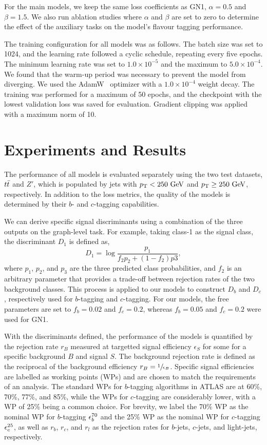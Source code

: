 For the main models, we keep the same loss coefficients as GN1, $\alpha = 0.5$ and $\beta = 1.5$.
We also run ablation studies where $\alpha$ and $\beta$ are set to zero to determine the effect of the auxiliary tasks on the model's flavour tagging performance.

The training configuration for all models was as follows.
The batch size was set to 1024, and the learning rate followed a cyclic schedule, repeating every five epochs.
The minimum learning rate was set to $1.0 \times 10^{-5}$ and the maximum to $5.0 \times 10^{-4}$.
We found that the warm-up period was necessary to prevent the model from diverging.
We used the AdamW~\cite{AdamW} optimizer with a $1.0 \times 10^{-4}$ weight decay.
The training was performed for a maximum of 50 epochs, and the checkpoint with the lowest validation loss was saved for evaluation.
Gradient clipping was applied with a maximum norm of 10.

\section{Experiments and Results}

The performance of all models is evaluated separately using the two test datasets, $t\bar{t}$ and $Z'$, which is populated by jets with $\pt < 250~\GeV$ and $\pt \geq 250~\GeV$, respectively.
In addition to the loss metrics, the quality of the models is determined by their $b$- and $c$-tagging capabilities.

We can derive specific signal discriminants using a combination of the three outputs on the graph-level task.
For example, taking class-1 as the signal class, the discriminant $D_1$ is defined as,
\begin{equation}
    D_1 = \log\frac{p_1}{f_2 p_2 + (1-f_2)p3},
\end{equation}
where $p_1$, $p_2$, and $p_3$ are the three predicted class probabilities, and $f_2$ is an arbitrary parameter that provides a trade-off between rejection rates of the two background classes.
This process is applied to our models to construct $D_b$ and $D_c$, respectively used for $b$-tagging and $c$-tagging.
For our models, the free parameters are set to $f_b=0.02$ and $f_c=0.2$, whereas $f_b=0.05$ and $f_c=0.2$ were used for GN1.

With the discriminants defined, the performance of the models is quantified by the rejection rate $r_B$ measured at targetted signal efficiency $\epsilon_S$ for some for a specific background $B$ and signal $S$.
The background rejection rate is defined as the reciprocal of the background efficiency $r_B = \sfrac{1}{\epsilon_B}$.
Specific signal efficiencies are labelled as working points (WPs) and are chosen to match the requirements of an analysis.
The standard WPs for $b$-tagging algorithms in ATLAS are at 60\%, 70\%, 77\%, and 85\%, while the WPs for $c$-tagging are considerably lower, with a WP of 25\% being a common choice.
For brevity, we label the 70\% WP as the nominal WP for $b$-tagging $\epsilon_b^{70}$ and the 25\% WP as the nominal WP for $c$-tagging $\epsilon_c^{25}$, as well as $r_b$, $r_c$, and $r_l$ as the rejection rates for $b$-jets, $c$-jets, and light-jets, respectively.


